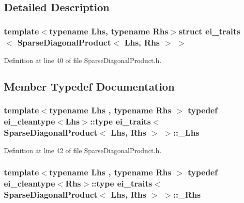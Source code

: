 \subsection{Detailed Description}
\subsubsection*{template$<$typename Lhs, typename Rhs$>$struct ei\-\_\-traits$<$ Sparse\-Diagonal\-Product$<$ Lhs, Rhs $>$ $>$}



Definition at line 40 of file Sparse\-Diagonal\-Product.\-h.



\subsection{Member Typedef Documentation}
\hypertarget{structei__traits_3_01_sparse_diagonal_product_3_01_lhs_00_01_rhs_01_4_01_4_a65e89474c7c726c265f8379dffa7186f}{
\subsubsection[{\-\_\-\-Lhs}]{\setlength{\rightskip}{0pt plus 5cm}template$<$typename Lhs , typename Rhs $>$ typedef {\bf ei\-\_\-cleantype}$<$Lhs$>$\-::{\bf type} {\bf ei\-\_\-traits}$<$ {\bf Sparse\-Diagonal\-Product}$<$ Lhs, Rhs $>$ $>$\-::{\bf \-\_\-\-Lhs}}}\label{structei__traits_3_01_sparse_diagonal_product_3_01_lhs_00_01_rhs_01_4_01_4_a65e89474c7c726c265f8379dffa7186f}


Definition at line 42 of file Sparse\-Diagonal\-Product.\-h.

\hypertarget{structei__traits_3_01_sparse_diagonal_product_3_01_lhs_00_01_rhs_01_4_01_4_aec3651785ab006cde359b60aac5564f5}{
\subsubsection[{\-\_\-\-Rhs}]{\setlength{\rightskip}{0pt plus 5cm}template$<$typename Lhs , typename Rhs $>$ typedef {\bf ei\-\_\-cleantype}$<$Rhs$>$\-::{\bf type} {\bf ei\-\_\-traits}$<$ {\bf Sparse\-Diagonal\-Product}$<$ Lhs, Rhs $>$ $>$\-::{\bf \-\_\-\-Rhs}}}\label{structei__traits_3_01_sparse_diagonal_product_3_01_lhs_00_01_rhs_01_4_01_4_aec3651785ab006cde359b60aac5564f5}


